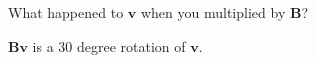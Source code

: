 What happened to $\boldsymbol{v}$ when you multiplied by $\boldsymbol{B}$?

\begin{solution}
$\boldsymbol{Bv}$ is a 30 degree rotation of $\boldsymbol{v}$.
\end{solution}